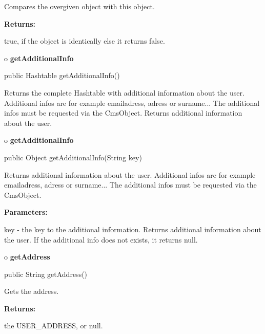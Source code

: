 \begin{description}
\htmlDD Compares the overgiven object with this object. 

\begin{description}
\item {\bf Returns:}  

true, if the object is identically else it returns false.  
\end{description}

\end{description}

o {\bf getAdditionalInfo} 

\begin{PRE}
 public Hashtable getAdditionalInfo()
\end{PRE}

\begin{description}
\htmlDD Returns the complete Hashtable with additional information about the
user. Additional infos are for example emailadress, adress or surname... The
additional infos must be requested via the CmsObject. Returns additional
information about the user. 

\end{description}

o {\bf getAdditionalInfo} 

\begin{PRE}
 public Object getAdditionalInfo(String key)
\end{PRE}

\begin{description}
\htmlDD Returns additional information about the user. Additional infos are
for example emailadress, adress or surname... The additional infos must be
requested via the CmsObject. 

\begin{description}
\item {\bf Parameters:}  

key - the key to the additional information. Returns additional information
about the user. If the additional info does not exists, it returns null.  
\end{description}

\end{description}

o {\bf getAddress} 

\begin{PRE}
 public String getAddress()
\end{PRE}

\begin{description}
\htmlDD Gets the address. 

\begin{description}
\item {\bf Returns:}  

the USER\_ADDRESS, or null.  
\end{description}

\end{description}


